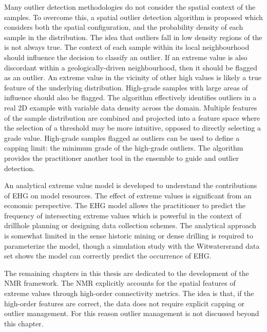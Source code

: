 Many outlier detection methodologies do not consider the spatial context of the samples. To overcome this, a spatial outlier detection algorithm is proposed which considers both the spatial configuration, and the probability density of each sample in the distribution. The idea that outliers fall in low density regions of the is not always true. The context of each sample within its local neighbourhood should influence the decision to classify an outlier. If an extreme value is also discordant within a geologically-driven neighbourhood, then it should be flagged as an outlier. An extreme value in the vicinity of other high values is likely a true feature of the underlying distribution. High-grade samples with large areas of influence should also be flagged. The algorithm effectively identifies outliers in a real \gls{2D} example with variable data density across the domain. Multiple features of the sample distribution are combined and projected into a feature space where the selection of a threshold may be more intuitive, opposed to directly selecting a grade value. High-grade samples flagged as outliers can be used to define a capping limit: the minimum grade of the high-grade outliers. The algorithm provides the practitioner another tool in the ensemble to guide and outlier detection.

An analytical extreme value model is developed to understand the contributions of \gls{EHG} on model resources. The effect of extreme values is significant from an economic perspective. The \gls{EHG} model allows the practitioner to predict the frequency of intersecting extreme values which is powerful in the context of drillhole planning or designing data collection schemes. The analytical approach is somewhat limited in the sense historic mining or dense drilling is required to parameterize the model, though a simulation study with the Witwatersrand data set shows the model can correctly predict the occurrence of \gls{EHG}.

The remaining chapters in this thesis are dedicated to the development of the \gls{NMR} framework. The \gls{NMR} explicitly accounts for the spatial features of extreme values through high-order connectivity metrics. The idea is that, if the high-order features are correct, the data does not require explicit capping or outlier management. For this reason outlier management is not discussed beyond this chapter.


